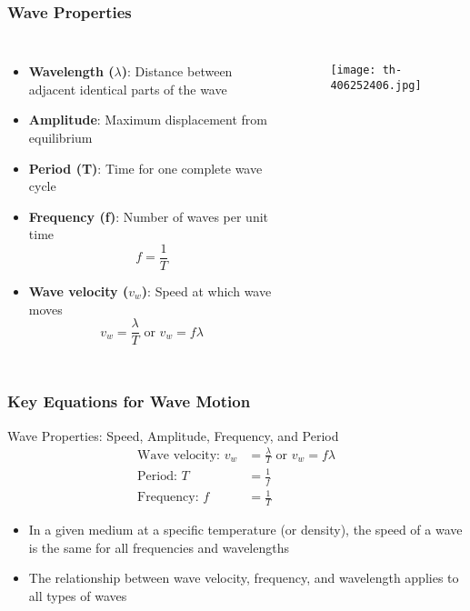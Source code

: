 \documentclass{beamer}
\begin{document}
\begin{frame}
\frametitle{Wave Properties}
\begin{columns}
\begin{itemize}
\item \textbf{Wavelength ($\lambda$)}: Distance between adjacent identical parts of the wave
\item \textbf{Amplitude}: Maximum displacement from equilibrium
\item \textbf{Period (T)}: Time for one complete wave cycle
\item \textbf{Frequency (f)}: Number of waves per unit time
\begin{equation}
f = \frac{1}{T}
\end{equation}
\item \textbf{Wave velocity ($v_w$)}: Speed at which wave moves
\begin{equation}
v_w = \frac{\lambda}{T} \text{ or } v_w = f\lambda
\end{equation}
\end{itemize}

\begin{figure}
    \centering
    \texttt{[image: th-406252406.jpg]}
\end{figure}
\end{columns}
\end{frame}

\begin{frame}
\frametitle{Key Equations for Wave Motion}
\begin{block}{Wave Properties: Speed, Amplitude, Frequency, and Period}
\begin{align}
\text{Wave velocity: } v_w &= \frac{\lambda}{T} \text{ or } v_w = f\lambda \\
\text{Period: } T &= \frac{1}{f} \\
\text{Frequency: } f &= \frac{1}{T}
\end{align}
\end{block}

\begin{itemize}
\item In a given medium at a specific temperature (or density), the speed of a wave is the same for all frequencies and wavelengths
\item The relationship between wave velocity, frequency, and wavelength applies to all types of waves
\end{itemize}
\end{frame}
\end{document}
